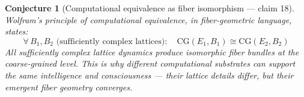 \documentclass[11pt,a4paper]{article}
\newtheorem{conjecture}[definition]{Conjecture}
\begin{document}
\begin{conjecture}[Computational equivalence as fiber isomorphism --- claim 18]
Wolfram's principle of computational equivalence, in fiber-geometric
language, states:
\[
  \forall\, B_1, B_2 \text{ (sufficiently complex lattices)}: \quad
  \text{CG}(E_1, B_1) \cong \text{CG}(E_2, B_2)
\]
All sufficiently complex lattice dynamics produce isomorphic fiber
bundles at the coarse-grained level. This is why different computational
substrates can support the same intelligence and consciousness ---
their lattice details differ, but their emergent fiber geometry converges.
\end{conjecture}
\end{document}
